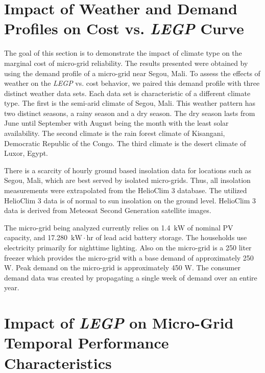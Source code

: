 \documentclass{article}
\newcommand{\unit}[1]{\ensuremath{\, \mathrm{#1}}}
\begin{document}
\section{Impact of Weather and Demand Profiles on Cost vs. \emph{LEGP} Curve}

The goal of this section is to demonstrate the impact of climate type on the marginal cost of micro-grid reliability.
The results presented were obtained by using the demand profile of a micro-grid near Segou, Mali. 
To assess the effects of weather on the \emph{LEGP} vs. cost behavior, we paired this demand profile with three distinct weather data sets. 
Each data set is characteristic of a different climate type. 
The first is the semi-arid climate of Segou, Mali. This weather pattern has two distinct seasons, a rainy season and a dry season.
The dry season lasts from June until September with August being the month with the least solar availability. %
The second climate is the rain forest climate of Kisangani, Democratic Republic of the Congo. %
The third climate is the desert climate of Luxor, Egypt. %

There is a scarcity of hourly ground based insolation data for locations such as Segou, Mali, which are best served by isolated micro-grids. 
Thus, all insolation measurements were extrapolated from the HelioClim 3 database. The utilized HelioClim 3 data is of normal to sun insolation on the ground level.
HelioClim 3 data is derived from Meteosat Second Generation satellite images. 

The micro-grid being analyzed currently relies on 1.4 \unit{kW} of nominal PV capacity, and 17.280 \unit{kW\cdot hr} of lead acid battery storage.
The households use electricity primarily for nighttime lighting.
Also on the micro-grid is a 250 liter freezer which provides the micro-grid with a base demand of approximately 250 W. 
Peak demand on the micro-grid is approximately 450 W. 
The consumer demand data was created by propagating a single week of demand over an entire year.

\section{Impact of \emph{LEGP} on Micro-Grid Temporal Performance Characteristics}
\end{document}
